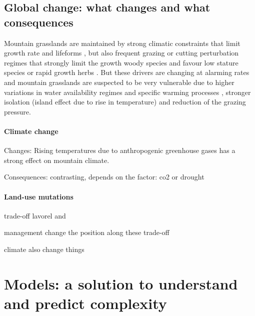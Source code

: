 \subsection{Global change: what changes and what consequences}

Mountain grasslands are maintained by strong climatic constraints that limit growth rate and lifeforms  \parencite{koorner_alpine_2003}, but also frequent grazing or cutting perturbation regimes that strongly limit the growth woody species and favour low stature species or rapid growth herbs \parencite{diaz_plant_2007}. But these drivers are changing at alarming rates and mountain grasslands are suspected to be very vulnerable \parencite{engler_21st_2011} due to higher variations in water availability regimes and specific warming processes \parencite{mountain_research_initiative_edw_working_group_elevation-dependent_2015}, stronger isolation (island effect due to rise in temperature) and reduction of the grazing pressure.

\paragraph{Climate change}
Changes:
Rising temperatures due to anthropogenic greenhouse gases has a strong effect on mountain climate. 

Consequences: contrasting, depends on the factor: co2 or drought

\paragraph{Land-use mutations}

trade-off lavorel and \parencite{schirpke_multiple_2012}

management change the position along these trade-off

climate also change things



 
%
\section{Models: a solution to understand and predict complexity}

